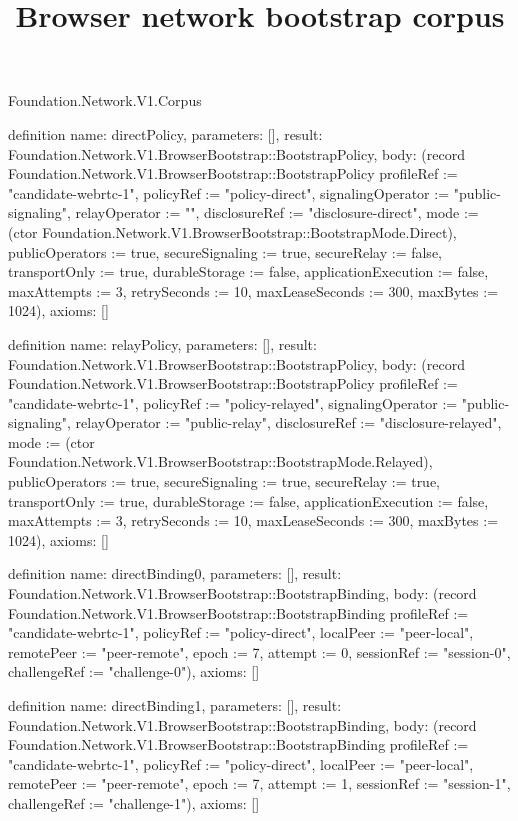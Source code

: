 \begin{lexlean}{Foundation.Network.V1.Corpus}
\title{Browser network bootstrap corpus}
\begin{semanticmodule}
definition{
  name: directPolicy,
  parameters: [],
  result: Foundation.Network.V1.BrowserBootstrap::BootstrapPolicy,
  body: (record Foundation.Network.V1.BrowserBootstrap::BootstrapPolicy {profileRef := "candidate-webrtc-1", policyRef := "policy-direct", signalingOperator := "public-signaling", relayOperator := "", disclosureRef := "disclosure-direct", mode := (ctor Foundation.Network.V1.BrowserBootstrap::BootstrapMode.Direct), publicOperators := true, secureSignaling := true, secureRelay := false, transportOnly := true, durableStorage := false, applicationExecution := false, maxAttempts := 3, retrySeconds := 10, maxLeaseSeconds := 300, maxBytes := 1024}),
  axioms: []
}

definition{
  name: relayPolicy,
  parameters: [],
  result: Foundation.Network.V1.BrowserBootstrap::BootstrapPolicy,
  body: (record Foundation.Network.V1.BrowserBootstrap::BootstrapPolicy {profileRef := "candidate-webrtc-1", policyRef := "policy-relayed", signalingOperator := "public-signaling", relayOperator := "public-relay", disclosureRef := "disclosure-relayed", mode := (ctor Foundation.Network.V1.BrowserBootstrap::BootstrapMode.Relayed), publicOperators := true, secureSignaling := true, secureRelay := true, transportOnly := true, durableStorage := false, applicationExecution := false, maxAttempts := 3, retrySeconds := 10, maxLeaseSeconds := 300, maxBytes := 1024}),
  axioms: []
}

definition{
  name: directBinding0,
  parameters: [],
  result: Foundation.Network.V1.BrowserBootstrap::BootstrapBinding,
  body: (record Foundation.Network.V1.BrowserBootstrap::BootstrapBinding {profileRef := "candidate-webrtc-1", policyRef := "policy-direct", localPeer := "peer-local", remotePeer := "peer-remote", epoch := 7, attempt := 0, sessionRef := "session-0", challengeRef := "challenge-0"}),
  axioms: []
}

definition{
  name: directBinding1,
  parameters: [],
  result: Foundation.Network.V1.BrowserBootstrap::BootstrapBinding,
  body: (record Foundation.Network.V1.BrowserBootstrap::BootstrapBinding {profileRef := "candidate-webrtc-1", policyRef := "policy-direct", localPeer := "peer-local", remotePeer := "peer-remote", epoch := 7, attempt := 1, sessionRef := "session-1", challengeRef := "challenge-1"}),
  axioms: []
}


\end{semanticmodule}
\end{lexlean}
